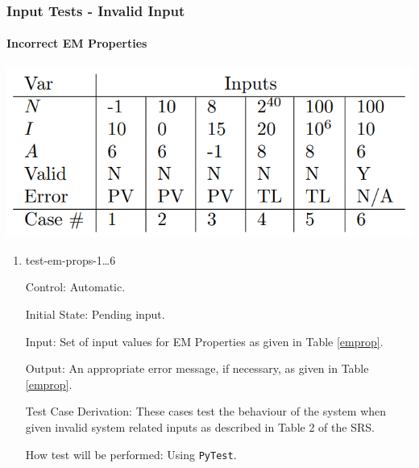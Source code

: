 \documentclass[12pt, titlepage]{article}
\begin{document}
\subsubsection{Input Tests - Invalid Input}

		
\paragraph{Incorrect EM Properties}
\begin{center}
  \includegraphics[scale=0.6]{EMInputTable.PNG} \\
  \label{emprop}
\end{center}

\begin{enumerate}

\item{test-em-props-1\dots6\\}

Control: Automatic.
					
Initial State: Pending input.
					
Input: Set of input values for EM Properties as given in Table \ref{emprop}.
					
Output: An appropriate error message, if necessary, as given in Table \ref{emprop}.

Test Case Derivation: These cases test the behaviour of the system when given invalid system related inputs as described in Table 2 of the SRS.
					
How test will be performed: Using \texttt{PyTest}. 
\end{enumerate}

\newpage
\end{document}
